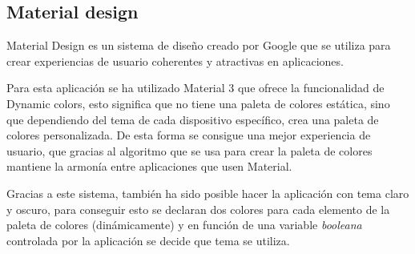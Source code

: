 \subsection{Material design}
\label{subsec:material_design}
Material Design\hyperlink{cap:biblio}{} es un sistema de diseño creado por Google que se utiliza para crear experiencias de usuario coherentes y atractivas en aplicaciones. 

Para esta aplicación se ha utilizado Material 3 que ofrece la funcionalidad de Dynamic colors, esto significa que no tiene una paleta de colores estática, sino que dependiendo del tema de cada dispositivo específico, crea una paleta de colores personalizada. De esta forma se consigue una mejor experiencia de usuario, que gracias al algoritmo que se usa para crear la paleta de colores mantiene la armonía entre aplicaciones que usen Material.

Gracias a este sistema, también ha sido posible hacer la aplicación con tema claro y oscuro, para conseguir esto se declaran dos colores para cada elemento de la paleta de colores (dinámicamente) y en función de una variable \textit{booleana} controlada por la aplicación se decide que tema se utiliza.